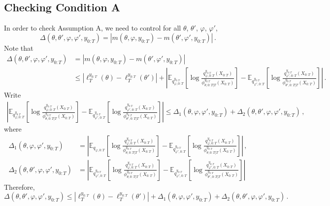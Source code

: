 \documentclass{article}
\newcommand{\1}{\mathbbm{1}}
\begin{document}
\subsection*{Checking Condition A}
In order to check Assumption A, we need to control for all $\theta$, $\theta'$, $\varphi$, $\varphi'$,
$$
\Delta(\theta, \theta', \varphi, \varphi', y_{0:T}) = \left|m(\theta,\varphi,y_{0:T})  - m(\theta',\varphi',y_{0:T}) \right|\,.
$$
Note that
\begin{align*}
\Delta(\theta, \theta', \varphi, \varphi', y_{0:T}) &= \left|m(\theta,\varphi,y_{0:T})  - m(\theta',\varphi',y_{0:T}) \right|\\
&\leq \left|\ell_T^{y_{0:T}}(\theta) - \ell_T^{y_{0:T}}(\theta')\right| + \left|\mathbb{E}_{q^{y_{0:T}}_{\varphi,0:T}}\left[\log \frac{q^{y_{0:T}}_{\varphi,0:T}(X_{0:T})}{\phi^{y_{0:T}}_{\theta,0:T|T}(X_{0:T})}\right] - \mathbb{E}_{q^{y_{0:T}}_{\varphi',0:T}}\left[\log \frac{q^{y_{0:T}}_{\varphi',0:T}(X_{0:T})}{\phi^{y_{0:T}}_{\theta',0:T|T}(X_{0:T})}\right]\right|\,.
\end{align*}
Write
\begin{multline*}
\left|\mathbb{E}_{q^{y_{0:T}}_{\varphi,0:T}}\left[\log \frac{q^{y_{0:T}}_{\varphi,0:T}(X_{0:T})}{\phi^{y_{0:T}}_{\theta,0:T|T}(X_{0:T})}\right] - \mathbb{E}_{q^{y_{0:T}}_{\varphi',0:T}}\left[\log \frac{q^{y_{0:T}}_{\varphi',0:T}(X_{0:T})}{\phi^{y_{0:T}}_{\theta',0:T|T}(X_{0:T})}\right]\right| \leq \Delta_1(\theta, \varphi, \varphi', y_{0:T}) + \Delta_2(\theta, \theta', \varphi, \varphi', y_{0:T})\,,
\end{multline*}
where
\begin{align*}
\Delta_1(\theta, \varphi, \varphi', y_{0:T})  &= \left|\mathbb{E}_{q_{\varphi,0:T}}\left[\log \frac{q^{y_{0:T}}_{\varphi,0:T}(X_{0:T})}{\phi^{y_{0:T}}_{\theta,0:T|T}(X_{0:T})}\right] - \mathbb{E}_{q^{y_{0:T}}_{\varphi',0:T}}\left[\log \frac{q^{y_{0:T}}_{\varphi,0:T}(X_{0:T})}{\phi^{y_{0:T}}_{\theta,0:T|T}(X_{0:T})}\right]\right|\,,\\
\Delta_2(\theta, \theta', \varphi, \varphi', y_{0:T})&= \left|\mathbb{E}_{q^{y_{0:T}}_{\varphi',0:T}}\left[\log \frac{q^{y_{0:T}}_{\varphi,0:T}(X_{0:T})}{\phi^{y_{0:T}}_{\theta,0:T|T}(X_{0:T})}\right] - \mathbb{E}_{q^{y_{0:T}}_{\varphi',0:T}}\left[\log \frac{q^{y_{0:T}}_{\varphi',0:T}(X_{0:T})}{\phi^{y_{0:T}}_{\theta',0:T|T}(X_{0:T})}\right]\right|
\end{align*}
Therefore, 
$$
\Delta(\theta, \theta', \varphi, \varphi', y_{0:T}) \leq \left|\ell_T^{y_{0:T}}(\theta) - \ell_T^{y_{0:T}}(\theta')\right| + \Delta_1(\theta, \varphi, \varphi', y_{0:T}) + \Delta_2(\theta, \theta', \varphi, \varphi', y_{0:T}) \,.
$$
\end{document}
